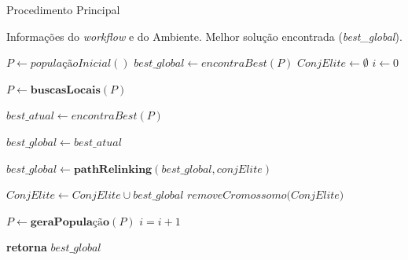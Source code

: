  \begin{algorithm}
 \caption{Procedimento Principal}\label{algo:HEA}

\begin{algorithmic}[1]
\Require Informações do \textit{workflow} e do Ambiente.
\Ensure Melhor solução encontrada (\textit{best\_global}).

\State $P \gets  \textit{populaçãoInicial}()$
\State $best\_global \gets encontraBest(P)$ 
\State $ConjElite \gets \emptyset$ 
\State $i \gets 0$ 

    \label{l:checkbl}
        \State $P \gets \textbf{buscasLocais}(P)$ 
    \EndIf
    
    \State $ best\_atual \gets encontraBest(P)$ 
    
    
        \State $best\_global \gets best\_atual$
        
         \label{l:path1}
            \State $best\_global \gets \textbf{pathRelinking}(best\_global, conjElite)$ \label{l:path2}            
        \EndIf
        
            
            \State $ConjElite \gets ConjElite \cup best\_global$ 
             \label{l:remove1}
                \State $\textit{removeCromossomo(ConjElite)}$ \label{l:remove2}
            \EndIf
        \EndIf    
    \EndIf
        
        \State $P \gets \textbf{geraPopulação}(P)$ 
        \State $i = i + 1$
        
\EndWhile
    
\State \textbf{retorna} $best\_global$

\end{algorithmic}
\end{algorithm}




